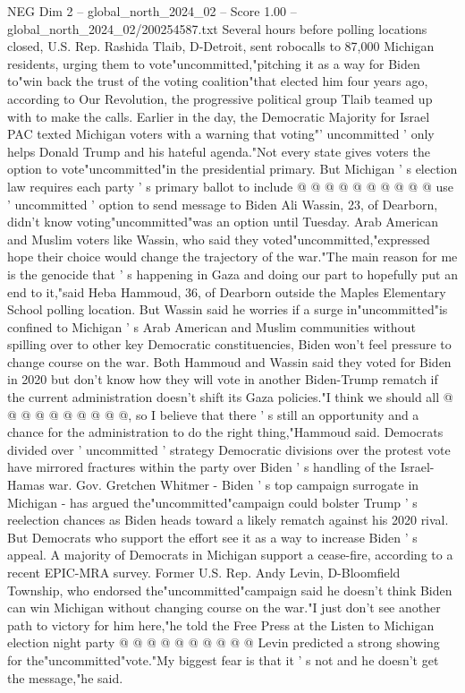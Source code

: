 \begin{textsample}{NEG Dim 2 – global\_north\_2024\_02 – Score 1.00 – global\_north\_2024\_02/200254587.txt}
Several hours before polling locations closed, U.S.
Rep.
Rashida Tlaib, D-Detroit, sent robocalls to 87,000 Michigan residents, urging them to vote"uncommitted,"pitching it as a way for Biden to"win back the trust of the voting coalition"that elected him four years ago, according to Our Revolution, the progressive political group Tlaib teamed up with to make the calls.
Earlier in the day, the Democratic Majority for Israel PAC texted Michigan voters with a warning that voting"' uncommitted ' only helps Donald Trump and his hateful agenda."Not every state gives voters the option to vote"uncommitted"in the presidential primary.
But Michigan ' s election law requires each party ' s primary ballot to include @ @ @ @ @ @ @ @ @ @ use ' uncommitted ' option to send message to Biden Ali Wassin, 23, of Dearborn, didn't know voting"uncommitted"was an option until Tuesday.
Arab American and Muslim voters like Wassin, who said they voted"uncommitted,"expressed hope their choice would change the trajectory of the war."The main reason for me is the genocide that ' s happening in Gaza and doing our part to hopefully put an end to it,"said Heba Hammoud, 36, of Dearborn outside the Maples Elementary School polling location.
But Wassin said he worries if a surge in"uncommitted"is confined to Michigan ' s Arab American and Muslim communities without spilling over to other key Democratic constituencies, Biden won't feel pressure to change course on the war.
Both Hammoud and Wassin said they voted for Biden in 2020 but don't know how they will vote in another Biden-Trump rematch if the current administration doesn't shift its Gaza policies."I think we should all @ @ @ @ @ @ @ @ @ @, so I believe that there ' s still an opportunity and a chance for the administration to do the right thing,"Hammoud said.
Democrats divided over ' uncommitted ' strategy Democratic divisions over the protest vote have mirrored fractures within the party over Biden ' s handling of the Israel-Hamas war.
Gov.
Gretchen Whitmer - Biden ' s top campaign surrogate in Michigan - has argued the"uncommitted"campaign could bolster Trump ' s reelection chances as Biden heads toward a likely rematch against his 2020 rival.
But Democrats who support the effort see it as a way to increase Biden ' s appeal.
A majority of Democrats in Michigan support a cease-fire, according to a recent EPIC-MRA survey.
Former U.S.
Rep.
Andy Levin, D-Bloomfield Township, who endorsed the"uncommitted"campaign said he doesn't think Biden can win Michigan without changing course on the war."I just don't see another path to victory for him here,"he told the Free Press at the Listen to Michigan election night party @ @ @ @ @ @ @ @ @ @ Levin predicted a strong showing for the"uncommitted"vote."My biggest fear is that it ' s not and he doesn't get the message,"he said.

\end{textsample}
